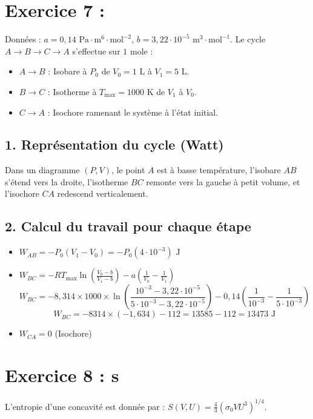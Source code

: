 \documentclass[a4paper,12pt]{article}
\begin{document}
 	\section*{Exercice 7 : }
 	Données : $a = 0,14\text{ Pa}\cdot\text{m}^6\cdot\text{mol}^{-2}$, $b = 3,22\cdot 10^{-5}\text{ m}^3\cdot\text{mol}^{-1}$.
 	Le cycle $A \rightarrow B \rightarrow C \rightarrow A$ s'effectue sur $1\text{ mole}$ :
 	\begin{itemize}
 		\item $A \rightarrow B$ : Isobare à $P_0$ de $V_0 = 1\text{ L}$ à $V_1 = 5\text{ L}$.
 		\item $B \rightarrow C$ : Isotherme à $T_{\text{max}} = 1000\text{ K}$ de $V_1$ à $V_0$.
 		\item $C \rightarrow A$ : Isochore ramenant le système à l'état initial.
 	\end{itemize}
 	
 	\subsection*{1. Représentation du cycle (Watt)}
 	Dans un diagramme $(P,V)$, le point $A$ est à basse température, l'isobare $AB$ s'étend vers la droite, l'isotherme $BC$ remonte vers la gauche à petit volume, et l'isochore $CA$ redescend verticalement.
 	
 	\subsection*{2. Calcul du travail pour chaque étape}
 	\begin{itemize}
 		\item $W_{AB} = -P_0(V_1 - V_0) = -P_0(4\cdot 10^{-3})\text{ J}$
 		\item $W_{BC} = -RT_{\text{max}} \ln\left(\frac{V_0-b}{V_1-b}\right) - a\left(\frac{1}{V_0} - \frac{1}{V_1}\right)$
 		\[ W_{BC} = -8,314 \times 1000 \times \ln\left(\frac{10^{-3} - 3,22\cdot 10^{-5}}{5\cdot 10^{-3} - 3,22\cdot 10^{-5}}\right) - 0,14\left(\frac{1}{10^{-3}} - \frac{1}{5\cdot 10^{-3}}\right) \]
 		\[ W_{BC} = -8314 \times (-1,634) - 112 = 13585 - 112 = 13473\text{ J} \]
 		\item $W_{CA} = 0$ (Isochore)
 	\end{itemize}
 	
 	\section*{Exercice 8 : s}
 	L'entropie d'une concavité est donnée par : $S(V,U) = \frac{4}{3}(\sigma_0 V U^3)^{1/4}$.
 	
\end{document}
